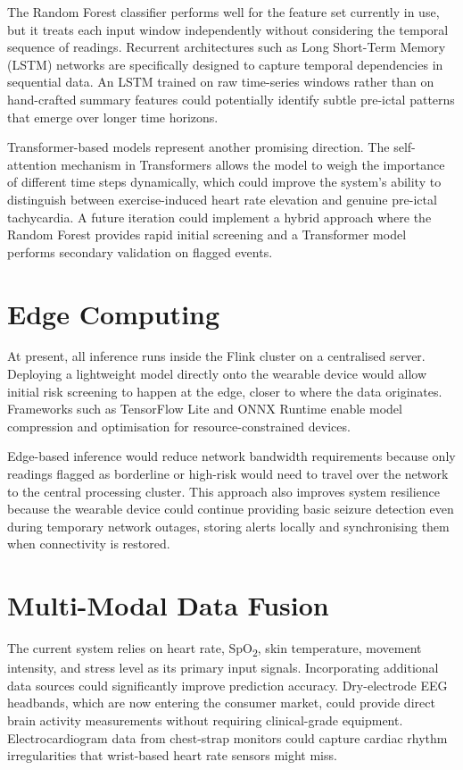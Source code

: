 \documentclass[12pt, a4paper, oneside]{report}
\begin{document}
The Random Forest classifier performs well for the feature set currently in use, but it treats each input window independently without considering the temporal sequence of readings. Recurrent architectures such as Long Short-Term Memory (LSTM) networks are specifically designed to capture temporal dependencies in sequential data. An LSTM trained on raw time-series windows rather than on hand-crafted summary features could potentially identify subtle pre-ictal patterns that emerge over longer time horizons.

Transformer-based models represent another promising direction. The self-attention mechanism in Transformers allows the model to weigh the importance of different time steps dynamically, which could improve the system's ability to distinguish between exercise-induced heart rate elevation and genuine pre-ictal tachycardia. A future iteration could implement a hybrid approach where the Random Forest provides rapid initial screening and a Transformer model performs secondary validation on flagged events.

\section{Edge Computing}

At present, all inference runs inside the Flink cluster on a centralised server. Deploying a lightweight model directly onto the wearable device would allow initial risk screening to happen at the edge, closer to where the data originates. Frameworks such as TensorFlow Lite and ONNX Runtime enable model compression and optimisation for resource-constrained devices.

Edge-based inference would reduce network bandwidth requirements because only readings flagged as borderline or high-risk would need to travel over the network to the central processing cluster. This approach also improves system resilience because the wearable device could continue providing basic seizure detection even during temporary network outages, storing alerts locally and synchronising them when connectivity is restored.

\section{Multi-Modal Data Fusion}

The current system relies on heart rate, SpO\textsubscript{2}, skin temperature, movement intensity, and stress level as its primary input signals. Incorporating additional data sources could significantly improve prediction accuracy. Dry-electrode EEG headbands, which are now entering the consumer market, could provide direct brain activity measurements without requiring clinical-grade equipment. Electrocardiogram data from chest-strap monitors could capture cardiac rhythm irregularities that wrist-based heart rate sensors might miss.
\end{document}
